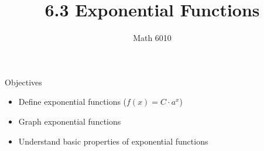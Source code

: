 \documentclass[]{beamer}
\title{6.3 Exponential Functions}
\author{Math 6010}
\institute{9-27-2023}
\date{}
\begin{document}
	\beamertemplatenavigationsymbolsempty
	
	\frame{\titlepage}
	
%		
	
	\begin{frame}{Objectives}
		\begin{itemize}
			\item Define exponential functions ($f(x) = C\cdot a^x$)
			\pause\vfill
			\item Graph exponential functions
			\pause\vfill
			\item Understand basic properties of exponential functions
		\end{itemize}
	\end{frame}
	
\end{document}
